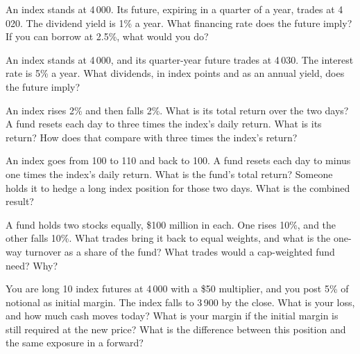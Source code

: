 \begin{question}\label{iq:iv2:etfs-futures-and-index-arbitrage:5}
An index stands at 4\,000. Its future, expiring in a quarter of a year, trades at 4\,020. The dividend yield is 1\% a year. What financing rate does the future imply? If you can borrow at 2.5\%, what would you do?
\end{question}

\begin{question}\label{iq:iv2:etfs-futures-and-index-arbitrage:6}
An index stands at 4\,000, and its quarter-year future trades at 4\,030. The interest rate is 5\% a year. What dividends, in index points and as an annual yield, does the future imply?
\end{question}

\begin{question}\label{iq:iv2:etfs-futures-and-index-arbitrage:7}
An index rises 2\% and then falls 2\%. What is its total return over the two days? A fund resets each day to three times the index's daily return. What is its return? How does that compare with three times the index's return?
\end{question}

\begin{question}\label{iq:iv2:etfs-futures-and-index-arbitrage:8}
An index goes from 100 to 110 and back to 100. A fund resets each day to minus one times the index's daily return. What is the fund's total return? Someone holds it to hedge a long index position for those two days. What is the combined result?
\end{question}

\begin{question}\label{iq:iv2:etfs-futures-and-index-arbitrage:9}
A fund holds two stocks equally, \$100 million in each. One rises 10\%, and the other falls 10\%. What trades bring it back to equal weights, and what is the one-way turnover as a share of the fund? What trades would a cap-weighted fund need? Why?
\end{question}

\begin{question}\label{iq:iv2:etfs-futures-and-index-arbitrage:10}
You are long 10 index futures at 4\,000 with a \$50 multiplier, and you post 5\% of notional as initial margin. The index falls to 3\,900 by the close. What is your loss, and how much cash moves today? What is your margin if the initial margin is still required at the new price? What is the difference between this position and the same exposure in a forward?
\end{question}

